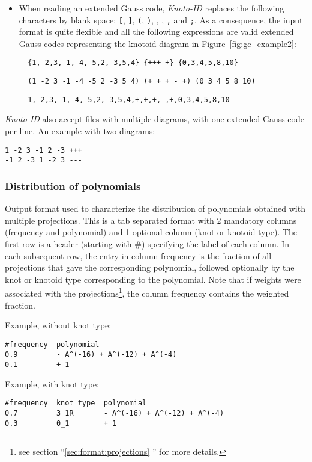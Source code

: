 \begin{itemize}
\item When reading an extended Gauss code, {\it Knoto-ID} replaces the following characters by blank space: \lstinline{[}, \lstinline{]}, \lstinline{(}, \lstinline{)}, \lstinlineT{\{}, \lstinlineT{\}}, \lstinline{,} and \lstinline{;}. As a consequence, the input format is quite flexible and all the following expressions are valid extended Gauss codes representing the knotoid diagram in  Figure~\ref{fig:gc_example2}:
\begin{lstlisting}
  {1,-2,3,-1,-4,-5,2,-3,5,4} {+++-+} {0,3,4,5,8,10}
\end{lstlisting}
\begin{lstlisting}
  (1 -2 3 -1 -4 -5 2 -3 5 4) (+ + + - +) (0 3 4 5 8 10)
\end{lstlisting}
\begin{lstlisting}
  1,-2,3,-1,-4,-5,2,-3,5,4,+,+,+,-,+,0,3,4,5,8,10
\end{lstlisting}
\end{itemize}

{\it Knoto-ID} also accept files with multiple diagrams, with one extended Gauss code per line. An example with two diagrams:
\begin{lstlisting}
1 -2 3 -1 2 -3 +++  
-1 2 -3 1 -2 3 ---
\end{lstlisting}



\subsubsection{\label{sec:format:multiprojection:jones}Distribution of polynomials}
Output format used to characterize the distribution of polynomials obtained with multiple projections. This is a tab separated format with 2 mandatory columns (frequency and polynomial) and 1 optional column (knot or knotoid type).
The first row is a header (starting with \#) specifying the label of each column.
In each subsequent row, the entry in column frequency is the fraction of all projections that gave the corresponding polynomial, followed optionally by the knot or knotoid type corresponding to the polynomial. Note that if weights were associated with the projections\footnote{see section ``\ref{sec:format:projections} '' for more details.}, the column frequency contains the weighted fraction.

Example, without knot type:
\begin{lstlisting}
#frequency  polynomial
0.9         - A^(-16) + A^(-12) + A^(-4)
0.1         + 1
\end{lstlisting}
Example, with knot type:
\begin{lstlisting}
#frequency  knot_type  polynomial
0.7         3_1R       - A^(-16) + A^(-12) + A^(-4)
0.3         0_1        + 1
\end{lstlisting}



